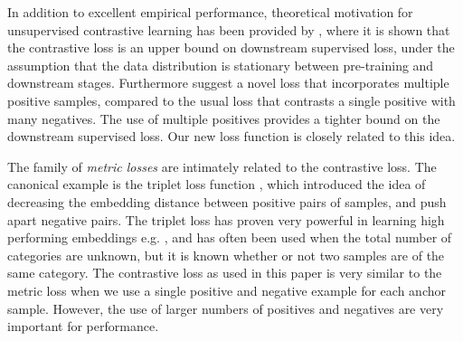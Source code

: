 In addition to excellent empirical performance, theoretical motivation for unsupervised contrastive learning has been provided by \cite{arora2019theoretical}, where it is shown that the contrastive loss is an upper bound on downstream supervised loss, under the assumption that the data distribution is stationary between pre-training and downstream stages. Furthermore \cite{arora2019theoretical} suggest a novel loss that incorporates multiple positive samples, compared to the usual loss that contrasts a single positive with many negatives. The use of multiple positives provides a tighter bound on the downstream supervised loss. Our new loss function is closely related to this idea.

The family of \emph{metric losses} are intimately related to the contrastive loss. The canonical example is the triplet loss function  \cite{weinberger2009distance}, which introduced the idea of decreasing the embedding distance between positive pairs of samples, and push apart negative pairs. The triplet loss has proven very powerful in learning high performing embeddings e.g. \cite{schroff2015facenet,chopra2005learning}, and has often been used when the total number of categories are unknown, but it is known whether or not two samples are of the same category. The contrastive loss as used in this paper is very similar to the metric loss when we use a single positive and negative example for each anchor sample. However, the use of larger numbers of positives and negatives are very important for performance.

\fi